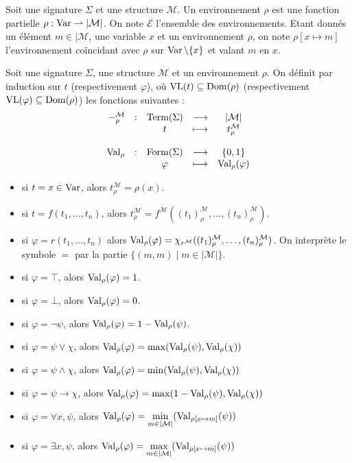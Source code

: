 \begin{definition}[Environnement]
  Soit une signature $\Sigma$ et une structure $\mathcal M$. Un environnement
  $\rho$ est une fonction partielle $\rho : \operatorname{Var}\rightharpoonup |\mathcal M|$. On note
  $\mathcal E$ l'ensemble des environnements. Etant donnés un élément
  $m\in|\mathcal M$, une variable $x$ et un environnement $\rho$, on note
  $\rho[x \mapsto m]$ l'environnement coïncidant avec $\rho$ sur
  $\operatorname{Var}\backslash\{x\}$ et valant $m$ en $x$.
\end{definition}

\begin{definition}
  Soit une signature $\Sigma$, une structure $\mathcal M$ et un environnement
  $\rho$. On définit par induction sur $t$ (respectivement $\varphi$), où
  $\operatorname{VL}(t)\subseteq\operatorname{Dom}(\rho)$ (respectivement $\operatorname{VL}(\varphi)\subseteq\operatorname{Dom}(\rho)$)
  les fonctions suivantes :
  \[\begin{array}{rcccc}
  -_\rho^\mathcal M & : & \operatorname{Term}(\Sigma) & \longrightarrow & |\mathcal M|\\
  & & t & \longmapsto & t^{\mathcal M}_\rho\\
  \\
  \operatorname{Val}_\rho & : & \operatorname{Form}(\Sigma) & \longrightarrow & \{0,1\}\\
  & & \varphi & \longmapsto & \operatorname{Val}_\rho(\varphi)
  \end{array}\]

  \begin{itemize}
  \item si $t = x \in \operatorname{Var}$, alors $t^\mathcal M_\rho = \rho(x)$.
  \item si $t = f(t_1,\ldots,t_n)$, alors
    $t_\rho^\mathcal M =
    f^\mathcal M((t_1)^\mathcal M_\rho,\ldots,(t_n)^\mathcal M_\rho)$.
  \item si $\varphi = r(t_1,\ldots,t_n)$ alors
    $\operatorname{Val}_\rho(\varphi) =
    \chi_{r^\mathcal M}((t_1)^\mathcal M_\rho,\ldots,(t_n)^\mathcal M_\rho)$.
    On interprète le symbole $=$ par la partie $\{(m,m)\mid m\in |\mathcal M|\}$.
  \item si $\varphi = \top$, alors $\operatorname{Val}_\rho(\varphi) = 1$.
  \item si $\varphi = \bot$, alors $\operatorname{Val}_\rho(\varphi) = 0$.
  \item si $\varphi = \lnot \psi$, alors
    $\operatorname{Val}_\rho(\varphi) = 1 - \operatorname{Val}_\rho(\psi)$.
  \item si $\varphi = \psi \lor \chi$, alors
    $\operatorname{Val}_\rho(\varphi) = \max(\operatorname{Val}_\rho(\psi),\operatorname{Val}_\rho(\chi))$
  \item si $\varphi = \psi \land \chi$, alors
    $\operatorname{Val}_\rho(\varphi) = \min(\operatorname{Val}_\rho(\psi),\operatorname{Val}_\rho(\chi))$
  \item si $\varphi = \psi \to \chi$, alors
    $\operatorname{Val}_\rho(\varphi) = \max(1 - \operatorname{Val}_\rho(\psi),\operatorname{Val}_\rho(\chi))$
  \item si $\varphi = \forall x, \psi$, alors
    $\displaystyle\operatorname{Val}_\rho(\varphi) =
    \min_{m \in |\mathcal M|}(\operatorname{Val}_{\rho[x\mapsto m]}(\psi))$
  \item si $\varphi = \exists x, \psi$, alors
    $\displaystyle\operatorname{Val}_\rho(\varphi) =
    \max_{m \in |\mathcal M|}(\operatorname{Val}_{\rho[x\mapsto m]}(\psi))$
  \end{itemize}
  

\end{definition}
